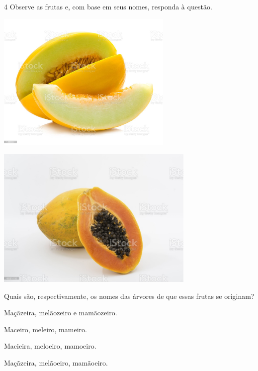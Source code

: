 \num{4} Observe as frutas e, com base em seus nomes, responda à questão.



\includegraphics[width=3.33412in,height=2.64722in]{./media/image39.jpeg}


\includegraphics[width=3.76501in,height=2.67500in]{./media/image40.jpeg}

Quais são, respectivamente, os nomes das árvores de que essas frutas se originam?

\begin{escolha}
\item Maçãzeira, melãozeiro e mamãozeiro.

\item Maceiro, meleiro, mameiro.

\item Macieira, meloeiro, mamoeiro.

\item Maçãzeira, melãoeiro, mamãoeiro.
\end{escolha}

